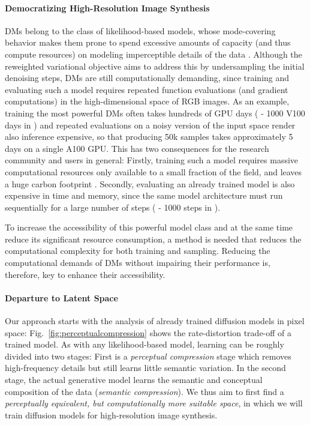 \documentclass[10pt,twocolumn,letterpaper]{article}
\begin{document}
\paragraph{Democratizing High-Resolution Image Synthesis}
\enlargethispage{\baselineskip}
%
%
DMs belong to the class of likelihood-based models, whose mode-covering behavior makes them prone to spend excessive amounts of capacity (and thus compute resources) on modeling imperceptible details of the data \cite{dieleman2020typicality, DBLP:journals/corr/SalimansKCK17}. 
Although the reweighted variational objective \cite{DBLP:conf/nips/HoJA20} 
%
aims to address this
by undersampling the initial denoising steps, 
%
%
DMs are still computationally demanding, since training and evaluating such a model requires repeated function evaluations (and gradient computations) in the high-dimensional space of RGB images.
As an example, training the most powerful DMs often takes hundreds of GPU days ( - 1000 V100 days in \cite{DBLP:journals/corr/abs-2105-05233})
and repeated evaluations on a noisy version of the input space render also inference expensive, so that producing 50k samples %
takes approximately 5 days \cite{DBLP:journals/corr/abs-2105-05233} %
on a single A100 GPU. 
%
This has two consequences for the research community and users in general: 
Firstly, training such a model 
%
requires massive computational resources only available to a small fraction of the field,
and leaves a huge carbon footprint \cite{DBLP:journals/corr/abs-2104-10350,DBLP:conf/aaai/StrubellGM20}. 
Secondly, evaluating an already trained model is also expensive in time and memory, since the same model architecture must
run sequentially for a large number of steps ( - 1000 steps in \cite{DBLP:journals/corr/abs-2105-05233}).

To increase the accessibility of this powerful model class and at the same time
    reduce its significant resource consumption, a method is needed that
    reduces the computational complexity for both training and sampling.
%
Reducing the computational demands of DMs without impairing their performance is, therefore, key to enhance their accessibility.

%
%

%
%
%
\vspace{-1.5em}
\paragraph{Departure to Latent Space}
%
%
%
Our approach starts with the analysis of already trained diffusion models in pixel space: 
Fig.~\ref{fig:perceptualcompression} shows the rate-distortion trade-off of a trained model. %
As with any likelihood-based model, learning can be roughly divided into two stages: First is a \emph{perceptual compression} stage which removes high-frequency details 
%
but %
still learns little semantic variation. 
In the second stage, the actual generative model learns the semantic and conceptual composition of the data (\emph{semantic compression}).
We thus aim to first find a \textsl{perceptually equivalent, but computationally more suitable space}, in which we will train diffusion models for high-resolution image synthesis. 
\end{document}
